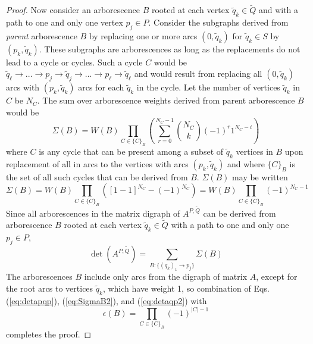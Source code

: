 \documentclass[10pt,a4paper]{amsart}
\begin{document}
\begin{proof}
Now consider an arborescence
$B$ rooted at each vertex $\tilde{q}_k \in \tilde{Q}$
and with a path to one and only one vertex $p_j \in P$.
Consider the subgraphs derived from {\em parent} arborescence
$B$ by replacing one or more
arcs $(0, \tilde{q}_k)$ for $\tilde{q}_k \in S$ by $(p_k, \tilde{q}_k)$.
These subgraphs are arborescences
as long as the replacements do not lead to a cycle or cycles.
Such a cycle $C$ would
be $\tilde{q}_\ell \to ... \to p_j \to \tilde{q}_j \to ... \to p_\ell
\to \tilde{q}_\ell$
and would
result from replacing all $(0, \tilde{q}_k)$ arcs with $(p_k, \tilde{q}_k)$
arcs for each $\tilde{q}_k$ in the cycle.
Let the number of vertices $\tilde{q}_k$ in $C$ be $N_C$.
The sum over arborescence weights derived from parent arborescence
$B$ would be
\begin{equation}
\Sigma(B) = W(B) \prod_{C \in \{C\}_B}
\left(\sum_{r = 0}^{N_C - 1} \binom{N_C}{k}
\left(-1\right)^r 1^{N_C - i}\right)
\label{eq:SigmaB}
\end{equation}
where $C$ is any cycle that can be present among a subset of $\tilde{q}_k$
vertices in $B$ upon replacement of all in arcs to the vertices with
arcs $(p_k, \tilde{q}_k)$ and where $\{C\}_B$ is the set of all such
cycles that can be derived from $B$.  $\Sigma(B)$ may be written
\begin{equation}
\Sigma(B) = W(B) \prod_{C \in \{C\}_B}\left([1 - 1]^{N_C} - \left(-1\right)^{N_C} \right)
= W(B) \prod_{C \in \{C\}_B}\left(-1\right)^{N_C - 1}
\label{eq:SigmaB2}
\end{equation}
Since all arborescences
in the matrix digraph of $A^{P, \tilde{Q}}$ can be derived
from arborescence $B$ rooted at each vertex $\tilde{q}_k \in \tilde{Q}$ with
a path to one and only one $p_j \in P$,
\begin{equation}
\det\left(A^{P, \tilde{Q}}\right) = \sum_{B:\{(q_k)_1 \to p_j\}} \Sigma(B)
\label{eq:detaqp2}
\end{equation}
The arborescences $B$ include only arcs from the digraph of matrix $A$, except
for the root arcs to vertices $\tilde{q}_k$, which have weight 1, so
combination of Eqs. (\ref{eq:detapqp}), (\ref{eq:SigmaB2}),
and (\ref{eq:detaqp2}) with
\begin{equation}
\epsilon(B) = \prod_{C \in \{C\}_B} \left(-1\right)^{\vert C \vert - 1}
\label{eq:epsilonB}
\end{equation}
completes the proof.
\end{proof}
\end{document}
